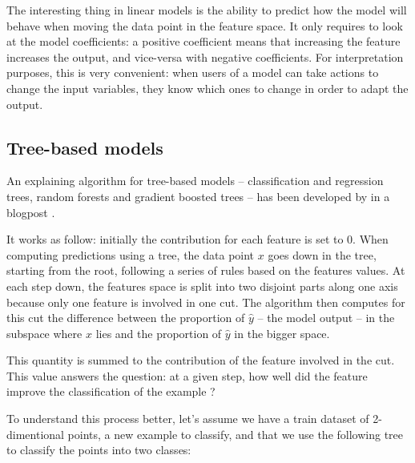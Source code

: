\documentclass[a4paper,11pt]{kth-mag}
\begin{document}
The interesting thing in linear models is the ability to predict how the model will behave when moving the data point in the feature space. It only requires to look at the model coefficients: a positive coefficient means that increasing the feature increases the output, and vice-versa with negative coefficients. For interpretation purposes, this is very convenient: when users of a model can take actions to change the input variables, they know which ones to change in order to adapt the output.

\subsection{Tree-based models}

An explaining algorithm for tree-based models -- classification and regression trees, random forests and gradient boosted trees -- has been developed by \citeauthor{treeinterpreter} in a blogpost \cite{treeinterpreter}.


It works as follow: initially the contribution for each feature is set to 0. When computing predictions using a tree, the data point $x$ goes down in the tree, starting from the root, following a series of rules based on the features values. At each step down, the features space is split into two disjoint parts along one axis because only one feature is involved in one cut. The algorithm then computes for this cut the difference between the proportion of $\hat{y}$ -- the model output -- in the subspace where $x$ lies and the proportion of $\hat{y}$ in the bigger space.

This quantity is summed to the contribution of the feature involved in the cut. This value answers the question: at a given step, how well did the feature improve the classification of the example ?

To understand this process better, let's assume we have a train dataset of 2-dimentional points, a new example to classify, and that we use the following tree to classify the points into two classes:
\end{document}
